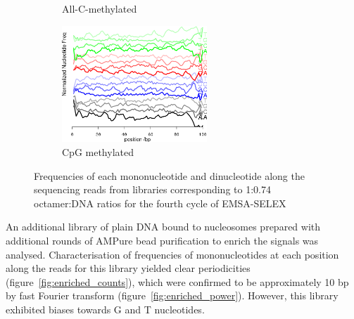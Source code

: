 \documentclass[parskip=full, numbers=noenddot]{scrreprt}
\begin{document}
\begin{figure}[htb]
\begin{subfigure}[htb]{0.6\textwidth}
    \caption{All-C-methylated}
    \label{fig:freqplots_g8}
  \end{subfigure}
  \begin{subfigure}[htb]{0.6\textwidth}
    \centering
    \includegraphics[width=0.6\textwidth]{emsa_h8_counts}
    \caption{CpG methylated}
    \label{fig:freqplots_h8}
  \end{subfigure}
  \caption{Frequencies of each mononucleotide and dinucleotide along the sequencing reads from libraries corresponding to 1:0.74 octamer:DNA ratios for the fourth cycle of EMSA-SELEX}
  \label{fig:freqplots}
\end{figure}

An additional library of plain DNA bound to nucleosomes prepared with additional rounds of AMPure bead purification to enrich the signals was analysed.  Characterisation of frequencies of mononucleotides at each position along the reads for this library yielded clear periodicities (figure~\ref{fig:enriched_counts}), which were confirmed to be approximately 10 bp by fast Fourier transform (figure~\ref{fig:enriched_power}).  However, this library exhibited biases towards G and T nucleotides.
\end{document}
